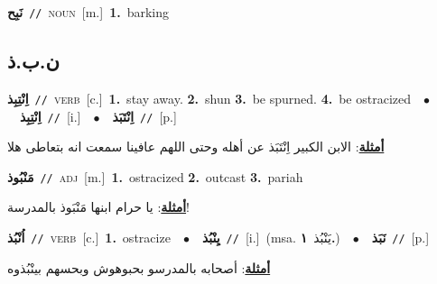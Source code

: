 \documentclass[10pt,a4paper,twoside]{article} %
\begin{document}
\begin{multicols}{2}
{{{\setlength\topsep{0pt}\textbf{\foreignlanguage{arabic}{نَبِح}}\ {\color{gray}\texttt{//}\color{black}}\ \textsc{noun}\ [m.]\ \textbf{1.}~barking\ 

\vspace{-3mm}
\subsection*{\color{blue}\foreignlanguage{arabic}{ن.ب.ذ}\color{blue}{}} 

{\setlength\topsep{0pt}\textbf{\foreignlanguage{arabic}{اِنْتِبِذ}}\ {\color{gray}\texttt{//}\color{black}}\ \textsc{verb}\ [c.]\ \textbf{1.}~stay away.  \textbf{2.}~shun  \textbf{3.}~be spurned.  \textbf{4.}~be ostracized\ \ $\bullet$\ \ \setlength\topsep{0pt}\textbf{\foreignlanguage{arabic}{اِنْتِبِذ}}\ {\color{gray}\texttt{//}\color{black}}\ [i.]\ \ $\bullet$\ \ \setlength\topsep{0pt}\textbf{\foreignlanguage{arabic}{اِنْتَبَذ}}\ {\color{gray}\texttt{//}\color{black}}\ [p.]\  \begin{flushright}\color{gray}\foreignlanguage{arabic}{\textbf{\underline{\foreignlanguage{arabic}{أمثلة}}}: الابن الكبير اِنْتَبَذ عن أهله وحتى اللهم عافينا سمعت انه بتعاطى هلا}\end{flushright}\color{black}} \vspace{2mm}

{\setlength\topsep{0pt}\textbf{\foreignlanguage{arabic}{مَنْبُوذ}}\ {\color{gray}\texttt{//}\color{black}}\ \textsc{adj}\ [m.]\ \textbf{1.}~ostracized  \textbf{2.}~outcast  \textbf{3.}~pariah\  \begin{flushright}\color{gray}\foreignlanguage{arabic}{\textbf{\underline{\foreignlanguage{arabic}{أمثلة}}}: يا حرام ابنها مَنْبَوذ بالمدرسة!}\end{flushright}\color{black}} \vspace{2mm}

{\setlength\topsep{0pt}\textbf{\foreignlanguage{arabic}{اُنْبُذ}}\ {\color{gray}\texttt{//}\color{black}}\ \textsc{verb}\ [c.]\ \textbf{1.}~ostracize\ \ $\bullet$\ \ \setlength\topsep{0pt}\textbf{\foreignlanguage{arabic}{يِنْبُذ}}\ {\color{gray}\texttt{//}\color{black}}\ [i.]\ \color{gray}(msa. \foreignlanguage{arabic}{يَنْبُذ}~\foreignlanguage{arabic}{\textbf{١.}})\color{black}\ \ $\bullet$\ \ \setlength\topsep{0pt}\textbf{\foreignlanguage{arabic}{نَبَذ}}\ {\color{gray}\texttt{//}\color{black}}\ [p.]\  \begin{flushright}\color{gray}\foreignlanguage{arabic}{\textbf{\underline{\foreignlanguage{arabic}{أمثلة}}}: أصحابه بالمدرسو بحبوهوش وبحسهم بينْبُذوه}\end{flushright}\color{black}} \vspace{2mm}

}}}
\end{multicols}
\end{document}
